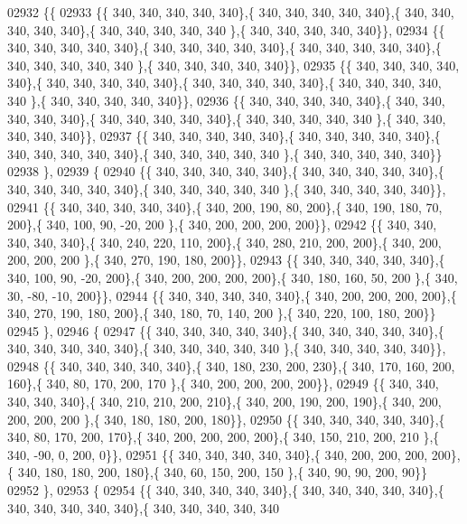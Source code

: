 \begin{DoxyCode}
02932 \{\{
02933 \{\{ 340, 340, 340, 340, 340\},\{ 340, 340, 340, 340, 340\},\{ 340, 340, 340, 340, 340\},\{ 340, 340, 340, 340, 340
      \},\{ 340, 340, 340, 340, 340\}\},
02934 \{\{ 340, 340, 340, 340, 340\},\{ 340, 340, 340, 340, 340\},\{ 340, 340, 340, 340, 340\},\{ 340, 340, 340, 340, 340
      \},\{ 340, 340, 340, 340, 340\}\},
02935 \{\{ 340, 340, 340, 340, 340\},\{ 340, 340, 340, 340, 340\},\{ 340, 340, 340, 340, 340\},\{ 340, 340, 340, 340, 340
      \},\{ 340, 340, 340, 340, 340\}\},
02936 \{\{ 340, 340, 340, 340, 340\},\{ 340, 340, 340, 340, 340\},\{ 340, 340, 340, 340, 340\},\{ 340, 340, 340, 340, 340
      \},\{ 340, 340, 340, 340, 340\}\},
02937 \{\{ 340, 340, 340, 340, 340\},\{ 340, 340, 340, 340, 340\},\{ 340, 340, 340, 340, 340\},\{ 340, 340, 340, 340, 340
      \},\{ 340, 340, 340, 340, 340\}\}
02938 \},
02939 \{
02940 \{\{ 340, 340, 340, 340, 340\},\{ 340, 340, 340, 340, 340\},\{ 340, 340, 340, 340, 340\},\{ 340, 340, 340, 340, 340
      \},\{ 340, 340, 340, 340, 340\}\},
02941 \{\{ 340, 340, 340, 340, 340\},\{ 340, 200, 190,  80, 200\},\{ 340, 190, 180,  70, 200\},\{ 340, 100,  90, -20, 200
      \},\{ 340, 200, 200, 200, 200\}\},
02942 \{\{ 340, 340, 340, 340, 340\},\{ 340, 240, 220, 110, 200\},\{ 340, 280, 210, 200, 200\},\{ 340, 200, 200, 200, 200
      \},\{ 340, 270, 190, 180, 200\}\},
02943 \{\{ 340, 340, 340, 340, 340\},\{ 340, 100,  90, -20, 200\},\{ 340, 200, 200, 200, 200\},\{ 340, 180, 160,  50, 200
      \},\{ 340,  30, -80, -10, 200\}\},
02944 \{\{ 340, 340, 340, 340, 340\},\{ 340, 200, 200, 200, 200\},\{ 340, 270, 190, 180, 200\},\{ 340, 180,  70, 140, 200
      \},\{ 340, 220, 100, 180, 200\}\}
02945 \},
02946 \{
02947 \{\{ 340, 340, 340, 340, 340\},\{ 340, 340, 340, 340, 340\},\{ 340, 340, 340, 340, 340\},\{ 340, 340, 340, 340, 340
      \},\{ 340, 340, 340, 340, 340\}\},
02948 \{\{ 340, 340, 340, 340, 340\},\{ 340, 180, 230, 200, 230\},\{ 340, 170, 160, 200, 160\},\{ 340,  80, 170, 200, 170
      \},\{ 340, 200, 200, 200, 200\}\},
02949 \{\{ 340, 340, 340, 340, 340\},\{ 340, 210, 210, 200, 210\},\{ 340, 200, 190, 200, 190\},\{ 340, 200, 200, 200, 200
      \},\{ 340, 180, 180, 200, 180\}\},
02950 \{\{ 340, 340, 340, 340, 340\},\{ 340,  80, 170, 200, 170\},\{ 340, 200, 200, 200, 200\},\{ 340, 150, 210, 200, 210
      \},\{ 340, -90,   0, 200,   0\}\},
02951 \{\{ 340, 340, 340, 340, 340\},\{ 340, 200, 200, 200, 200\},\{ 340, 180, 180, 200, 180\},\{ 340,  60, 150, 200, 150
      \},\{ 340,  90,  90, 200,  90\}\}
02952 \},
02953 \{
02954 \{\{ 340, 340, 340, 340, 340\},\{ 340, 340, 340, 340, 340\},\{ 340, 340, 340, 340, 340\},\{ 340, 340, 340, 340, 340

\end{DoxyCode}
